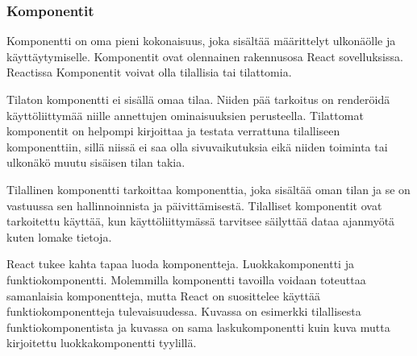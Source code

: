 \subsubsection{Komponentit}











Komponentti on oma pieni kokonaisuus, joka sisältää määrittelyt ulkonäölle ja käyttäytymiselle.
Komponentit ovat olennainen rakennusosa React sovelluksissa.
Reactissa Komponentit voivat olla tilallisia tai tilattomia. 
\medskip



Tilaton komponentti ei sisällä omaa tilaa. 
Niiden pää tarkoitus on renderöidä käyttöliittymää niille annettujen ominaisuuksien perusteella.
Tilattomat komponentit on helpompi kirjoittaa ja testata verrattuna tilalliseen komponenttiin, 
sillä niissä ei saa olla sivuvaikutuksia eikä niiden toiminta tai ulkonäkö muutu sisäisen tilan takia.
\medskip


Tilallinen komponentti tarkoittaa komponenttia, 
joka sisältää oman tilan ja se on vastuussa sen hallinnoinnista ja päivittämisestä.
Tilalliset komponentit ovat tarkoitettu käyttää, kun käyttöliittymässä tarvitsee säilyttää dataa ajanmyötä 
kuten lomake tietoja.\\
\medskip







React tukee kahta tapaa luoda komponentteja. Luokkakomponentti ja funktiokomponentti.
Molemmilla komponentti tavoilla voidaan toteuttaa samanlaisia komponentteja, mutta React on suosittelee käyttää funktiokomponentteja tulevaisuudessa. 
Kuvassa \nextImageCount {} on esimerkki tilallisesta funktiokomponentista ja
kuvassa \nextnextImageCount {} on sama laskukomponentti kuin kuva \nextImageCount{} mutta kirjoitettu luokkakomponentti tyylillä. 
\medskip


